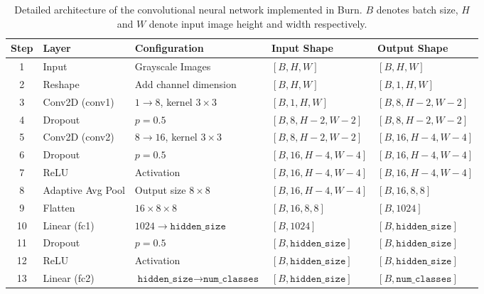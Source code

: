 \documentclass[10pt,a4paper,twocolumn]{article}
\begin{document}
\begin{table}[t!]
\centering
\renewcommand{\arraystretch}{1.3}
\begin{tabular}{|c|l|l|l|l|}
\hline
\textbf{Step} & \textbf{Layer} & \textbf{Configuration} & \textbf{Input Shape} & \textbf{Output Shape} \\
\hline

1 & Input & Grayscale Images & 
$[B, H, W]$ &
$[B, H, W]$ \\

\hline
2 & Reshape & Add channel dimension &
$[B, H, W]$ &
$[B, 1, H, W]$ \\

\hline
3 & Conv2D (conv1) &
$1 \rightarrow 8$, kernel $3 \times 3$ &
$[B, 1, H, W]$ &
$[B, 8, H-2, W-2]$ \\

\hline
4 & Dropout &
$p = 0.5$ &
$[B, 8, H-2, W-2]$ &
$[B, 8, H-2, W-2]$ \\

\hline
5 & Conv2D (conv2) &
$8 \rightarrow 16$, kernel $3 \times 3$ &
$[B, 8, H-2, W-2]$ &
$[B, 16, H-4, W-4]$ \\

\hline
6 & Dropout &
$p = 0.5$ &
$[B, 16, H-4, W-4]$ &
$[B, 16, H-4, W-4]$ \\

\hline
7 & ReLU &
Activation &
$[B, 16, H-4, W-4]$ &
$[B, 16, H-4, W-4]$ \\

\hline
8 & Adaptive Avg Pool &
Output size $8 \times 8$ &
$[B, 16, H-4, W-4]$ &
$[B, 16, 8, 8]$ \\

\hline
9 & Flatten &
$16 \times 8 \times 8$ &
$[B, 16, 8, 8]$ &
$[B, 1024]$ \\

\hline
10 & Linear (fc1) &
$1024 \rightarrow \texttt{hidden\_size}$ &
$[B, 1024]$ &
$[B, \texttt{hidden\_size}]$ \\

\hline
11 & Dropout &
$p = 0.5$ &
$[B, \texttt{hidden\_size}]$ &
$[B, \texttt{hidden\_size}]$ \\

\hline
12 & ReLU &
Activation &
$[B, \texttt{hidden\_size}]$ &
$[B, \texttt{hidden\_size}]$ \\

\hline
13 & Linear (fc2) &
$\texttt{hidden\_size} \rightarrow \texttt{num\_classes}$ &
$[B, \texttt{hidden\_size}]$ &
$[B, \texttt{num\_classes}]$ \\

\hline
\end{tabular}
\caption{Detailed architecture of the convolutional neural network implemented in Burn. 
$B$ denotes batch size, $H$ and $W$ denote input image height and width respectively.}
\label{tab:burn-cnn-architecture}
\end{table}
\end{document}
